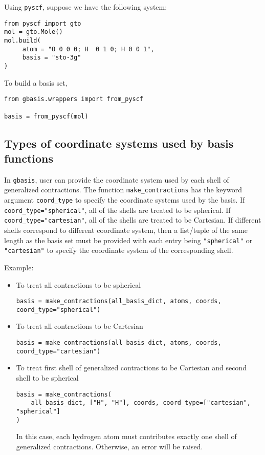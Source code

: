 \documentclass[letterpaper]{article}
\begin{document}
Using \verb|pyscf|, suppose we have the following system:
\begin{lstlisting}
from pyscf import gto
mol = gto.Mole()
mol.build(
     atom = "O 0 0 0; H  0 1 0; H 0 0 1",
     basis = "sto-3g"
)
\end{lstlisting}
To build a basis set,
\begin{lstlisting}
from gbasis.wrappers import from_pyscf

basis = from_pyscf(mol)
\end{lstlisting}

\subsection{Types of coordinate systems used by basis functions}
In \verb|gbasis|, user can provide the coordinate system used by each shell of
generalized contractions.
The function \verb|make_contractions| has the keyword argument \verb|coord_type| to
specify the coordinate systems used by the basis.
If \verb|coord_type="spherical"|, all of the shells are treated to be spherical.
If \verb|coord_type="cartesian"|, all of the shells are treated to be
Cartesian.
If different shells correspond to different coordinate system, then a list/tuple
of the same length as the basis set must be provided with each entry being
\verb|"spherical"| or \verb|"cartesian"| to specify the coordinate system of the
corresponding shell.

Example:
\begin{itemize}
\item To treat all contractions to be spherical
  \begin{lstlisting}[xleftmargin=-25pt]
basis = make_contractions(all_basis_dict, atoms, coords, coord_type="spherical")
\end{lstlisting}
\item To treat all contractions to be Cartesian
  \begin{lstlisting}[xleftmargin=-25pt]
basis = make_contractions(all_basis_dict, atoms, coords, coord_type="cartesian")
\end{lstlisting}
\item To treat first shell of generalized contractions to be Cartesian and
  second shell to be spherical
  \begin{lstlisting}[xleftmargin=-25pt]
basis = make_contractions(
    all_basis_dict, ["H", "H"], coords, coord_type=["cartesian", "spherical"]
)
\end{lstlisting}
In this case, each hydrogen atom must contributes exactly one shell of generalized contractions. Otherwise, an error will be raised.
\end{itemize}
\end{document}
